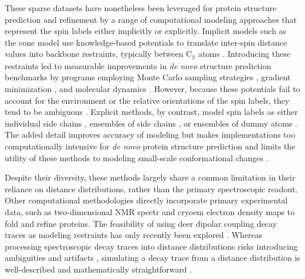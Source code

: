 These sparse datasets have nonetheless been leveraged for protein structure prediction and refinement by a range of computational modeling approaches that represent the spin labels either implicitly or explicitly. Implicit models such as the \gls{cone} model \citep*{Alexander2008} use knowledge-based potentials to translate inter-spin distance values into backbone restraints, typically between $\mathrm{C_{\upbeta}}$ atoms \citep*{Sale2005}. Introducing these restraints led to measurable improvements in \emph{de novo} structure prediction benchmarks by programs employing Monte Carlo sampling strategies \citep*{Alexander2008, Fischer2015, Fischer2017, Fischer2016, Hirst2011, Kazmier2011}, gradient minimization \citep*{Ling2016, Yang2010}, and molecular dynamics \citep*{MacCallum2015}. However, because these potentials fail to account for the environment or the relative orientations of the spin labels, they tend to be ambiguous \citep*{Sale2005}. Explicit methods, by contrast, model spin labels as either individual side chains \citep*{Alexander2013, Dastvan2016, Krug2016,  Marinelli2019, Marinelli2015}, ensembles of side chains \citep*{Hagelueken2012, Hatmal2012, Hilger2007, Polyhach2011}, or ensembles of dummy atoms \citep*{Islam2013, Kazmier2014, Kazmier2014a}. The added detail improves accuracy of modeling but makes implementations too computationally intensive for \emph{de novo} protein structure prediction and limits the utility of these methods to modeling small-scale conformational changes \citep*{Kazmier2014, Kazmier2014a, Marinelli2019}.

Despite their diversity, these methods largely share a common limitation in their reliance on distance distributions, rather than the primary spectroscopic readout. Other computational methodologies directly incorporate primary experimental data, such as two-dimensional NMR spectr \citep*{Meiler2003} and \gls{cryoem} electron density maps \citep*{Wang2016} to fold and refine proteins. The feasibility of using \gls{deer} dipolar coupling decay traces as modeling restraints has only recently been explored \citep*{Marinelli2019}. Whereas processing spectroscopic decay traces into distance distributions risks introducing ambiguities and artifacts \citep*{Brandon2012, Hustedt2018, Jeschke2006, K.IlkerSen2007, Worswick2018}, simulating a decay trace from a distance distribution is well-described and mathematically straightforward \citep*{Hogben2011, Hustedt2018, Jeschke2012, Marinelli2019}.

